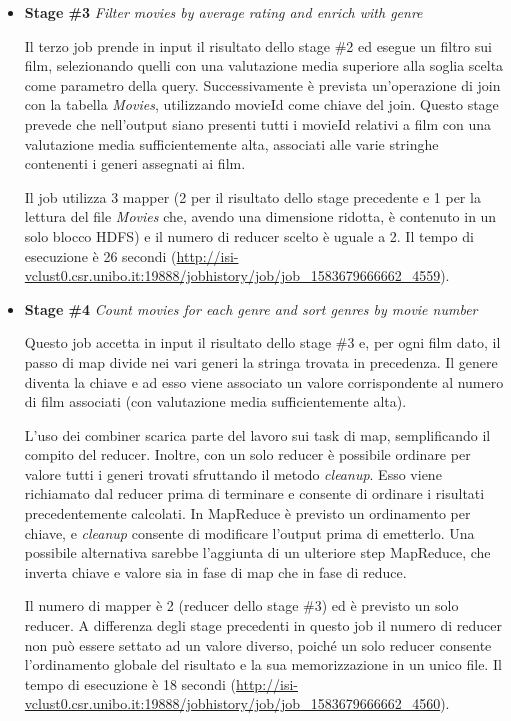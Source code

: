 \documentclass[10pt]{article}
\begin{document}
\begin{itemize}
\item \textbf{Stage \#3} \textit{Filter movies by average rating and enrich with genre}

Il terzo job prende in input il risultato dello stage \#2 ed esegue un filtro sui film, selezionando quelli con una valutazione media superiore alla soglia scelta come parametro della query. Successivamente è prevista un'operazione di join con la tabella \textit{Movies}, utilizzando movieId come chiave del join. Questo stage prevede che nell'output siano presenti tutti i movieId relativi a film con una valutazione media sufficientemente alta, associati alle varie stringhe contenenti i generi assegnati ai film.

Il job utilizza 3 mapper (2 per il risultato dello stage precedente e 1 per la lettura del file \textit{Movies} che, avendo una dimensione ridotta, è contenuto in un solo blocco HDFS) e il numero di reducer scelto è uguale a 2. Il tempo di esecuzione è 26 secondi (\url{http://isi-vclust0.csr.unibo.it:19888/jobhistory/job/job_1583679666662_4559}).

\item \textbf{Stage \#4} \textit{Count movies for each genre and sort genres by movie number}

Questo job accetta in input il risultato dello stage \#3 e, per ogni film dato, il passo di map divide nei vari generi la stringa trovata in precedenza. Il genere diventa la chiave e ad esso viene associato un valore corrispondente al numero di film associati (con valutazione media sufficientemente alta).

L'uso dei combiner scarica parte del lavoro sui task di map, semplificando il compito del reducer. Inoltre, con un solo reducer è possibile ordinare per valore tutti i generi trovati sfruttando il metodo \textit{cleanup}. Esso viene richiamato dal reducer prima di terminare e consente di ordinare i risultati precedentemente calcolati. In MapReduce è previsto un ordinamento per chiave, e \textit{cleanup} consente di modificare l'output prima di emetterlo. Una possibile alternativa sarebbe l'aggiunta di un ulteriore step MapReduce, che inverta chiave e valore sia in fase di map che in fase di reduce.

Il numero di mapper è 2 (reducer dello stage \#3) ed è previsto un solo reducer. A differenza degli stage precedenti in questo job il numero di reducer non può essere settato ad un valore diverso, poiché un solo reducer consente l'ordinamento globale del risultato e la sua memorizzazione in un unico file. Il tempo di esecuzione è 18 secondi (\url{http://isi-vclust0.csr.unibo.it:19888/jobhistory/job/job_1583679666662_4560}).
\end{itemize}
\end{document}
